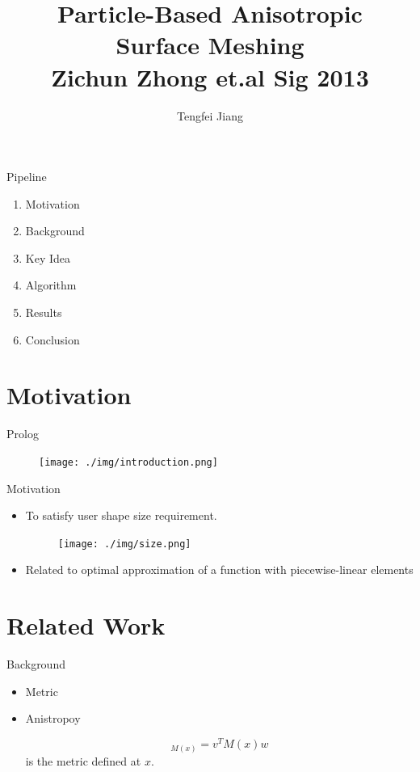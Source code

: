 \documentclass{beamer}
\begin{document}
\title{Particle-Based Anisotropic\\ Surface Meshing\\
\small{Zichun Zhong et.al Sig 2013}}
\author{Tengfei Jiang}

\newcommand{\FPP}[2]{\frac{\partial #1}{\partial #2}}
\begin{frame}
  \titlepage
\end{frame}

\begin{frame}{Pipeline}
  \begin{enumerate}
    \item Motivation 
    \item Background
    \item Key Idea
    \item Algorithm
    \item Results
    \item Conclusion
  \end{enumerate}
\end{frame}

\section{Motivation}
\begin{frame}{Prolog}
\begin{figure}
\centering
\texttt{[image: ./img/introduction.png]}
\end{figure}
\end{frame}

\begin{frame}{Motivation}
\begin{itemize}
\item 
To satisfy user shape size requirement.
\begin{figure}
\texttt{[image: ./img/size.png]}
\end{figure}
\item Related to optimal approximation of a function with piecewise-linear elements
\end{itemize}
\end{frame}


\section{Related Work}
\begin{frame}{Background}
\begin{itemize}
\item Metric
\item Anistropoy
  \begin{block}{}
    \[<v,w>_{M(x)}=v^TM(x)w\]
     is the metric defined at $x$.
  \end{block}
\end{itemize}
\end{frame}
\end{document}
